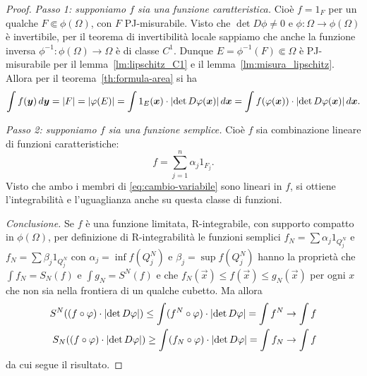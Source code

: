 \begin{proof}
\emph{Passo 1: supponiamo $f$ sia una funzione caratteristica.}
  Cioè $f = 1_{F}$ per un qualche $F\Subset \phi(\Omega)$, con $F$ PJ-misurabile.
  Visto che $\det D\phi\neq 0$ e $\phi\colon \Omega\to \phi(\Omega)$ è 
  invertibile, per il teorema di invertibilità locale sappiamo 
  che anche la funzione inversa $\phi^{-1}\colon \phi(\Omega)\to \Omega$ è di classe $C^1$.
  Dunque $E=\phi^{-1}(F)\Subset \Omega$ è PJ-misurabile per il lemma~\ref{lm:lipschitz_C1} 
  e il lemma~\ref{lm:misura_lipschitz}.
  Allora per il teorema~\ref{th:formula-area} si ha
  \[
  \int f(\boldsymbol y)\, d\boldsymbol y
  = {\left|F\right|} = {\left|\varphi(E)\right|} = \int 1_E(\boldsymbol x) \cdot {\left|\det D\varphi(\boldsymbol x)\right|}\, d\boldsymbol x
  = \int f(\varphi(\boldsymbol x)) \cdot {\left|\det D\varphi(\boldsymbol x)\right|}\, d\boldsymbol x.
  \]

\emph{Passo 2: supponiamo $f$ sia una funzione semplice.}
Cioè $f$ sia combinazione lineare di funzioni caratteristiche:
\[
   f = \sum_{j=1}^n \alpha_j 1_{F_j}.
\]
Visto che ambo i membri di \eqref{eq:cambio-variabile} sono lineari in $f$,
si ottiene l'integrabilità e l'uguaglianza anche su questa classe di funzioni.

\emph{Conclusione.} Se $f$ è una funzione limitata, R-integrabile, con supporto
compatto in $\phi(\Omega)$, per definizione di R-integrabilità 
le funzioni semplici $f_N = \sum \alpha_j 1_{Q^N_j}$ 
e $f_N = \sum \beta_j 1_{Q^N_j}$ con $\alpha_j = \inf f(Q^N_j)$ e $\beta_j = \sup f(Q^N_j)$
hanno la proprietà che $\int f_N = S_N(f)$ e $\int g_N = S^N(f)$ e che $f_N(\vec x) \le f(\vec x) \le g_N(\vec x)$ 
per ogni $x$ che non sia nella frontiera di un qualche cubetto.
Ma allora 
\begin{align*}
  S^N((f\circ \varphi)\cdot {\left|\det D\varphi\right|})
  \le \int (f^N\circ\varphi)\cdot {\left|\det D\varphi\right|}
  = \int f^N \to \int f\\
  S_N((f\circ \varphi)\cdot {\left|\det D\varphi\right|})
  \ge \int (f_N\circ \varphi)\cdot {\left|\det D\varphi\right|}
  = \int f_N \to \int f
\end{align*}
da cui segue il risultato.
\end{proof}

